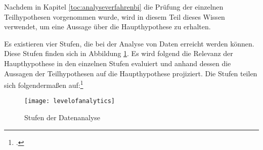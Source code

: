 Nachdem in Kapitel \ref{toc:analyseverfahrenbi} die Prüfung der einzelnen Teilhypothesen vorgenommen wurde,
wird in diesem Teil dieses Wissen verwendet, um eine Aussage über die Haupthypothese zu erhalten.

Es existieren vier Stufen, die bei der Analyse von Daten erreicht werden können. Diese Stufen finden sich in Abbildung
\ref{figure:levelofanalysis}. Es wird folgend die Relevanz der Haupthypothese in den einzelnen Stufen evaluiert
und anhand dessen die Aussagen der Teilhypothesen auf die Haupthypothese projiziert. Die Stufen teilen sich
folgendermaßen auf:\footcite[Vgl.][Abb. 2]{bihani2014comparative}

\begin{figure}[H]
    \caption{Stufen der Datenanalyse}
    \texttt{[image: levelofanalytics]}
    \label{figure:levelofanalysis}
    \\
    \cite[Quelle: In Anlehnung an][Abb. 2]{bihani2014comparative}
\end{figure}

